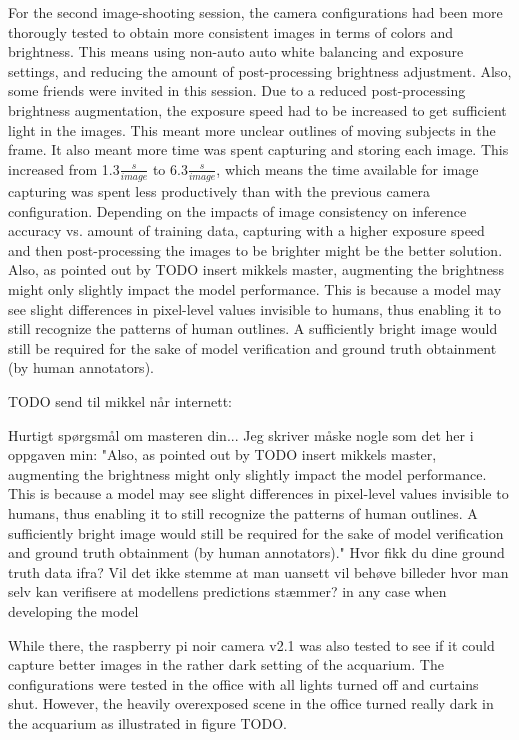For the second image-shooting session, the camera configurations had been more thorougly tested to obtain more consistent images in terms of colors and brightness. This means using non-auto auto white balancing and exposure settings, and reducing the amount of post-processing brightness adjustment. Also, some friends were invited in this session. Due to a reduced post-processing brightness augmentation, the exposure speed had to be increased to get sufficient light in the images. This meant more unclear outlines of moving subjects in the frame. It also meant more time was spent capturing and storing each image. This increased from 1.3$\frac{s}{image}$ to 6.3$\frac{s}{image}$, which means the time available for image capturing was spent less productively than with the previous camera configuration. Depending on the impacts of image consistency on inference accuracy vs. amount of training data, capturing with a higher exposure speed and then post-processing the images to be brighter might be the better solution. Also, as pointed out by TODO insert mikkels master, augmenting the brightness might only slightly impact the model performance. This is because a model may see slight differences in pixel-level values invisible to humans, thus enabling it to still recognize the patterns of human outlines. A sufficiently bright image would still be required for the sake of model verification and ground truth obtainment (by human annotators). 




TODO send til mikkel når internett:

Hurtigt spørgsmål om masteren din... Jeg skriver måske nogle som det her i oppgaven min:
"Also, as pointed out by TODO insert mikkels master, augmenting the brightness might only slightly impact the model performance. This is because a model may see slight differences in pixel-level values invisible to humans, thus enabling it to still recognize the patterns of human outlines. A sufficiently bright image would still be required for the sake of model verification and ground truth obtainment (by human annotators)."
Hvor fikk du dine ground truth data ifra? Vil det ikke stemme at man uansett vil behøve billeder hvor man selv kan verifisere at modellens predictions stæmmer? in any case when developing the model






While there, the raspberry pi noir camera v2.1 was also tested to see if it could capture better images in the rather dark setting of the acquarium. The configurations were tested in the office with all lights turned off and curtains shut. However, the heavily overexposed scene in the office turned really dark in the acquarium as illustrated in figure TODO.

